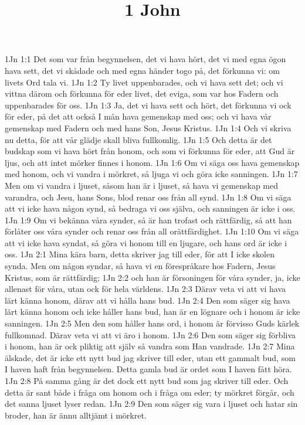 

\title{1 John}

1Jn 1:1  Det som var från begynnelsen, det vi hava hört, det vi med egna ögon hava sett, det vi skådade och med egna händer togo på, det förkunna vi: om livets Ord tala vi.
1Jn 1:2  Ty livet uppenbarades, och vi hava sett det; och vi vittna därom och förkunna för eder livet, det eviga, som var hos Fadern och uppenbarades för oss.
1Jn 1:3  Ja, det vi hava sett och hört, det förkunna vi ock för eder, på det att också I mån hava gemenskap med oss; och vi hava vår gemenskap med Fadern och med hans Son, Jesus Kristus.
1Jn 1:4  Och vi skriva nu detta, för att vår glädje skall bliva fullkomlig.
1Jn 1:5  Och detta är det budskap som vi hava hört från honom, och som vi förkunna för eder, att Gud är ljus, och att intet mörker finnes i honom.
1Jn 1:6  Om vi säga oss hava gemenskap med honom, och vi vandra i mörkret, så ljuga vi och göra icke sanningen.
1Jn 1:7  Men om vi vandra i ljuset, såsom han är i ljuset, så hava vi gemenskap med varandra, och Jesu, hans Sons, blod renar oss från all synd.
1Jn 1:8  Om vi säga att vi icke hava någon synd, så bedraga vi oss själva, och sanningen är icke i oss.
1Jn 1:9  Om vi bekänna våra synder, så är han trofast och rättfärdig, så att han förlåter oss våra synder och renar oss från all orättfärdighet.
1Jn 1:10  Om vi säga att vi icke hava syndat, så göra vi honom till en ljugare, och hans ord är icke i oss.
1Jn 2:1  Mina kära barn, detta skriver jag till eder, för att I icke skolen synda. Men om någon syndar, så hava vi en förespråkare hos Fadern, Jesus Kristus, som är rättfärdig;
1Jn 2:2  och han är försoningen för våra synder, ja, icke allenast för våra, utan ock för hela världens.
1Jn 2:3  Därav veta vi att vi hava lärt känna honom, därav att vi hålla hans bud.
1Jn 2:4  Den som säger sig hava lärt känna honom och icke håller hans bud, han är en lögnare och i honom är icke sanningen.
1Jn 2:5  Men den som håller hans ord, i honom är förvisso Guds kärlek fullkomnad. Därav veta vi att vi äro i honom.
1Jn 2:6  Den som säger sig förbliva i honom, han är ock pliktig att själv så vandra som Han vandrade.
1Jn 2:7  Mina älskade, det är icke ett nytt bud jag skriver till eder, utan ett gammalt bud, som I haven haft från begynnelsen. Detta gamla bud är ordet som I haven fått höra.
1Jn 2:8  På samma gång är det dock ett nytt bud som jag skriver till eder. Och detta är sant både i fråga om honom och i fråga om eder; ty mörkret förgår, och det sanna ljuset lyser redan.
1Jn 2:9  Den som säger sig vara i ljuset och hatar sin broder, han är ännu alltjämt i mörkret.
